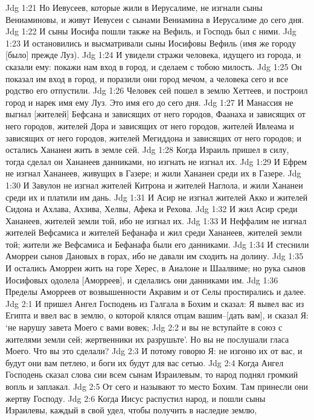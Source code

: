 Jdg 1:21  Но Иевусеев, которые жили в Иерусалиме, не изгнали сыны Вениаминовы, и живут Иевусеи с сынами Вениамина в Иерусалиме до сего дня.
Jdg 1:22  И сыны Иосифа пошли также на Вефиль, и Господь был с ними.
Jdg 1:23  И остановились и высматривали сыны Иосифовы Вефиль (имя же городу [было] прежде Луз).
Jdg 1:24  И увидели стражи человека, идущего из города, и сказали ему: покажи нам вход в город, и сделаем с тобою милость.
Jdg 1:25  Он показал им вход в город, и поразили они город мечом, а человека сего и все родство его отпустили.
Jdg 1:26  Человек сей пошел в землю Хеттеев, и построил город и нарек имя ему Луз. Это имя его до сего дня.
Jdg 1:27  И Манассия не выгнал [жителей] Бефсана и зависящих от него городов, Фаанаха и зависящих от него городов, жителей Дора и зависящих от него городов, жителей Ивлеама и зависящих от него городов, жителей Мегиддона и зависящих от него городов; и остались Хананеи жить в земле сей.
Jdg 1:28  Когда Израиль пришел в силу, тогда сделал он Хананеев данниками, но изгнать не изгнал их.
Jdg 1:29  И Ефрем не изгнал Хананеев, живущих в Газере; и жили Хананеи среди их в Газере.
Jdg 1:30  И Завулон не изгнал жителей Китрона и жителей Наглола, и жили Хананеи среди их и платили им дань.
Jdg 1:31  И Асир не изгнал жителей Акко и жителей Сидона и Ахлава, Ахзива, Хелвы, Афека и Рехова.
Jdg 1:32  И жил Асир среди Хананеев, жителей земли той, ибо не изгнал их.
Jdg 1:33  И Неффалим не изгнал жителей Вефсамиса и жителей Бефанафа и жил среди Хананеев, жителей земли той; жители же Вефсамиса и Бефанафа были его данниками.
Jdg 1:34  И стеснили Аморреи сынов Дановых в горах, ибо не давали им сходить на долину.
Jdg 1:35  И остались Аморреи жить на горе Херес, в Аиалоне и Шаалвиме; но рука сынов Иосифовых одолела [Аморреев], и сделались они данниками им.
Jdg 1:36  Пределы Аморреев от возвышенности Акравим и от Селы простирались и далее.
Jdg 2:1  И пришел Ангел Господень из Галгала в Бохим и сказал: Я вывел вас из Египта и ввел вас в землю, о которой клялся отцам вашим--[дать вам], и сказал Я: `не нарушу завета Моего с вами вовек;
Jdg 2:2  и вы не вступайте в союз с жителями земли сей; жертвенники их разрушьте'. Но вы не послушали гласа Моего. Что вы это сделали?
Jdg 2:3  И потому говорю Я: не изгоню их от вас, и будут они вам петлею, и боги их будут для вас сетью.
Jdg 2:4  Когда Ангел Господень сказал слова сии всем сынам Израилевым, то народ поднял громкий вопль и заплакал.
Jdg 2:5  От сего и называют то место Бохим. Там принесли они жертву Господу.
Jdg 2:6  Когда Иисус распустил народ, и пошли сыны Израилевы, каждый в свой удел, чтобы получить в наследие землю,
